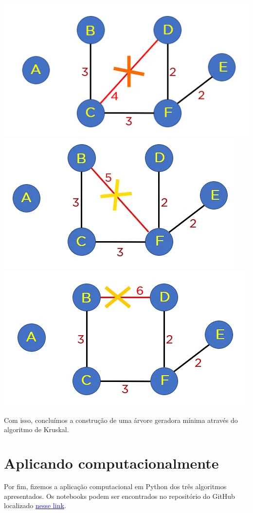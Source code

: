 \documentclass{article}
\begin{document}
\includegraphics[width=.32\textwidth]{Kruskal/iter4.png}\hfill
\includegraphics[width=.32\textwidth]{Kruskal/iter5.png}\hfill
\includegraphics[width=.32\textwidth]{Kruskal/iter6.png}




\begin{figure}%
    \centering
\end{figure}

Com isso, concluímos a construção de uma árvore geradora mínima através do algoritmo de Kruskal.

\section{Aplicando computacionalmente}

Por fim, fizemos a aplicação computacional em Python dos três algoritmos apresentados. Os notebooks podem ser encontrados no repositório do GitHub localizado \href{https://github.com/kauanmaf/trabalho_mat_discreta}{\textcolor{blue}{nesse link}}.
\end{document}
